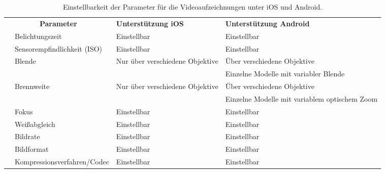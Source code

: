 \begin{table}[H]
    \begin{tabularx}{\textwidth}{ |l|l|X|X| }
        \hline
        \multicolumn{2}{|c|}{\textbf{Parameter}} & \textbf{Unterstützung iOS} & \textbf{Unterstützung Android}  \\
        \Xhline{0.5mm}
        \multirow{4}{*}{\parbox[c]{3mm}{}} & Belichtungszeit & Einstellbar \cite{iOS_VideoSettings, iOS_Exposure} & Einstellbar \cite{Android_CaptureRequest} \\
        \cline{2-4}
        & Sensorempfindlichkeit (ISO) & Einstellbar \cite{iOS_VideoSettings, iOS_Exposure} & Einstellbar \cite{Android_CaptureRequest}  \\
        \cline{2-4}
        & Blende & Nur über verschiedene Objektive & Über verschiedene Objektive \\ & & & Einzelne Modelle mit variabler Blende \cite{VariableAperture_Smartphones} \\
        \hline
        \multirow{3}{*}{\parbox[c]{3mm}{}} & Brennweite & Nur über verschiedene Objektive & Über verschiedene Objektive \\ & & & Einzelne Modelle mit variablem optischem Zoom \cite{Sony_VariableZoom} \\
        \cline{2-4}
        & Fokus & Einstellbar \cite{iOS_Focus} & Einstellbar \cite{Android_CaptureRequest} \\
        \hline
        & Weißabgleich & Einstellbar \cite{iOS_WhiteBalance} & Einstellbar \cite{Android_CaptureRequest} \\
        \cline{2-4}
        & Bildrate & Einstellbar \cite{iOS_Format} & Einstellbar \cite{Android_CaptureRequest} \\
        \cline{2-4}
        & Bildformat & Einstellbar \cite{iOS_Format} & Einstellbar \cite{Android_CaptureRequest} \\
        \cline{2-4}
        & Kompressionsverfahren/Codec & Einstellbar \cite{iOS_VideoSettings} & Einstellbar \cite{Android_MediaCodec} \\
        \hline
    \end{tabularx}
    \caption{Einstellbarkeit der Parameter für die Videoaufzeichnungen unter iOS und Android.}
    \label{tab:parameter_support}
\end{table}
